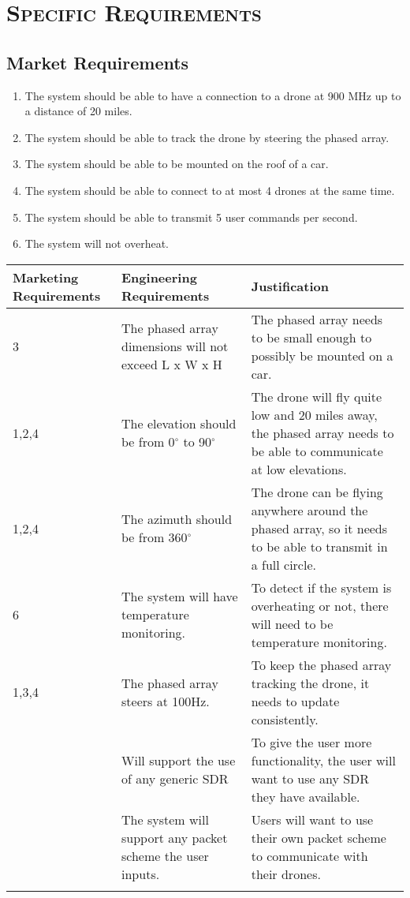 \documentclass[ProjectRequirements.tex]{subfiles}
\begin{document}
\bigskip

\section{\textsc{\Large Specific Requirements}}
	\subsection{Market Requirements}
	\begin{enumerate}
		\item The system should be able to have a connection to a drone at 900 MHz up to a distance of 20 miles.
		\item The system should be able to track the drone by steering the phased array.
		\item The system should be able to be mounted on the roof of a car.
		\item The system should be able to connect to at most 4 drones at the same time.
		\item The system should be able to transmit 5 user commands per second.
		\item The system will not overheat.
	\end{enumerate}
	\begin{center}
	\begin{tabular}{| p{2.3cm} | p{5cm} | p{7cm} |} \hline
		Marketing Requirements & Engineering Requirements & Justification \\ \hline \hline
		3 & The phased array dimensions will not exceed L x W x H & The phased array needs to be small enough to possibly be mounted on a car. \\ \hline
		1,2,4 & The elevation should be from 0$^{\circ}$ to 90$^{\circ}$ & The drone will fly quite low and 20 miles away, the phased array needs to be able to communicate at low elevations.\\\hline
		1,2,4 & The azimuth should be from 360$^{\circ}$ & The drone can be flying anywhere around the phased array, so it needs to be able to transmit in a full circle. \\\hline
		6 & The system will have temperature monitoring. & To detect if the system is overheating or not, there will need to be temperature monitoring. \\\hline
		1,3,4  & The phased array steers at 100Hz. & To keep the phased array tracking the drone, it needs to update consistently. \\\hline
		 & Will support the use of any generic SDR & To give the user more functionality, the user will want to use any SDR they have available.\\\hline
		 & The system will support any packet scheme the user inputs. & Users will want to use their own packet scheme to communicate with their drones.\\\hline
		 & & \\\hline
	\end{tabular}
	\end{center}
\end{document}
